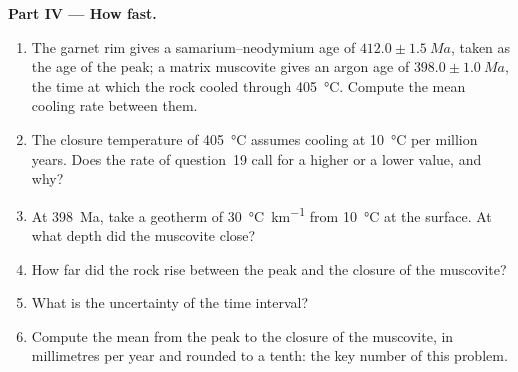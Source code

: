 \begin{problem}
\noindent\textbf{Part IV --- How fast.}
\begin{enumerate}[resume]
\item The garnet rim gives a samarium--neodymium age of $412.0 \pm \qty{1.5}{Ma}$, taken
as the age of the peak; a matrix muscovite gives an argon age of $398.0 \pm
\qty{1.0}{Ma}$, the time at which the rock cooled through \qty{405}{\celsius}. Compute
the mean cooling rate between them.
\item The closure temperature of \qty{405}{\celsius} assumes cooling at
\qty{10}{\celsius} per million years. Does the rate of question~19 call for a higher or a
lower value, and why?
\item At \qty{398}{Ma}, take a geotherm of \qty{30}{\celsius\per\km} from
\qty{10}{\celsius} at the surface. At what depth did the muscovite close?
\item How far did the rock rise between the peak and the closure of the muscovite?
\item What is the uncertainty of the time interval?
\item Compute the mean  from the peak to the closure of the muscovite, in
millimetres per year and rounded to a tenth: the key number of this problem.
\end{enumerate}
\end{problem}
